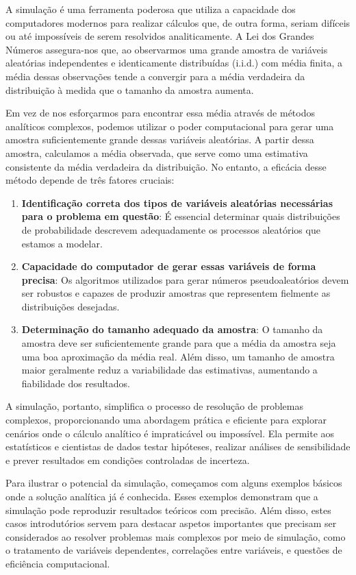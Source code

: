 \documentclass[
]{book}
\providecommand{\tightlist}{%
  \setlength{\itemsep}{0pt}\setlength{\parskip}{0pt}}
\begin{document}
A simulação é uma ferramenta poderosa que utiliza a capacidade dos
computadores modernos para realizar cálculos que, de outra forma, seriam
difíceis ou até impossíveis de serem resolvidos analiticamente. A Lei
dos Grandes Números assegura-nos que, ao observarmos uma grande amostra
de variáveis aleatórias independentes e identicamente distribuídas
(i.i.d.) com média finita, a média dessas observações tende a convergir
para a média verdadeira da distribuição à medida que o tamanho da
amostra aumenta.

Em vez de nos esforçarmos para encontrar essa média através de métodos
analíticos complexos, podemos utilizar o poder computacional para gerar
uma amostra suficientemente grande dessas variáveis aleatórias. A partir
dessa amostra, calculamos a média observada, que serve como uma
estimativa consistente da média verdadeira da distribuição. No entanto,
a eficácia desse método depende de três fatores cruciais:

\begin{enumerate}
\def\labelenumi{\arabic{enumi}.}
\tightlist
\item
  \textbf{Identificação correta dos tipos de variáveis aleatórias
  necessárias para o problema em questão}: É essencial determinar
  quais distribuições de probabilidade descrevem adequadamente os
  processos aleatórios que estamos a modelar.
\item
  \textbf{Capacidade do computador de gerar essas variáveis de forma
  precisa}: Os algoritmos utilizados para gerar números
  pseudoaleatórios devem ser robustos e capazes de produzir amostras
  que representem fielmente as distribuições desejadas.
\item
  \textbf{Determinação do tamanho adequado da amostra}: O tamanho da
  amostra deve ser suficientemente grande para que a média da amostra
  seja uma boa aproximação da média real. Além disso, um tamanho de
  amostra maior geralmente reduz a variabilidade das estimativas,
  aumentando a fiabilidade dos resultados.
\end{enumerate}

A simulação, portanto, simplifica o processo de resolução de problemas
complexos, proporcionando uma abordagem prática e eficiente para
explorar cenários onde o cálculo analítico é impraticável ou impossível.
Ela permite aos estatísticos e cientistas de dados testar hipóteses,
realizar análises de sensibilidade e prever resultados em condições
controladas de incerteza.

Para ilustrar o potencial da simulação, começamos com alguns exemplos
básicos onde a solução analítica já é conhecida. Esses exemplos
demonstram que a simulação pode reproduzir resultados teóricos com
precisão. Além disso, estes casos introdutórios servem para destacar
aspetos importantes que precisam ser considerados ao resolver problemas
mais complexos por meio de simulação, como o tratamento de variáveis
dependentes, correlações entre variáveis, e questões de eficiência
computacional.
\end{document}
